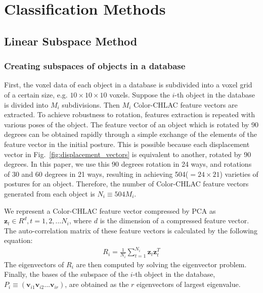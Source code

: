 \documentclass[conference]{sty/IEEEtran}
\begin{document}
\section{Classification Methods}

\subsection{Linear Subspace Method}
\label{sec:subspace}
\subsubsection{Creating subspaces of objects in a database}
First, the voxel data of each object in a database is subdivided into a voxel grid of a certain size, 
    e.g. $10 \times 10 \times 10$ voxels. 
Suppose the $i$-th object in the database is divided into $M_i$ subdivisions.
Then $M_i$ Color-CHLAC feature vectors are extracted. 
To achieve robustness to rotation, 
    features extraction is repeated with various poses of the object. 
The feature vector of an object which is rotated by 90 degrees can be obtained rapidly
    through a simple exchange of the elements of the feature vector in the initial posture.
This is possible because each displacement vector in Fig.~\ref{fig:displacement_vectors}
    is equivalent to another, rotated by 90 degrees.
In this paper, we use this 90 degrees rotation in 24 ways,
    and rotations of 30 and 60 degrees in 21 ways, 
    resulting in achieving 504($=24 \times 21$) varieties of postures for an object. 
Therefore, the number of Color-CHLAC feature vectors 
    generated from each object is $N_i \equiv 504M_i$. 

We represent a Color-CHLAC feature vector compressed by PCA as $\bm{z}_t \in R^d, t=1,2,...N_i$, 
    where $d$ is the dimension of a compressed feature vector.
The auto-correlation matrix of these feature vectors is calculated by the following equation: 
\begin{eqnarray*}
  R_i = \frac{1}{N_i} \sum^{N_i}_{t=1} \bm{z}_t \bm{z}_t^T
\end{eqnarray*}
The eigenvectors of $R_i$ are then computed by solving the eigenvector problem. 
Finally, the bases of the subspace of the $i$-th object in the database, $P_i \equiv (\bm{v}_{i1} \bm{v}_{i2} ... \bm{v}_{ir})$, 
    are obtained as the $r$ eigenvectors of largest eigenvalue. 
\end{document}
